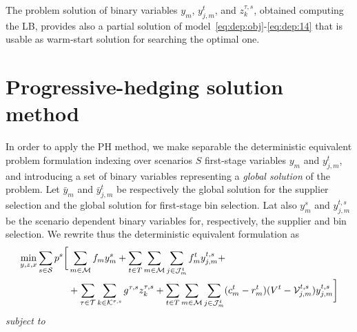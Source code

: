 \documentclass[a4paper,11pt]{article}
\begin{document}
	The problem solution of binary variables $ y_m$, $ y_{j,m}^t$, and $ z_k^{\tau,s}$, obtained computing the LB, provides also a partial solution of model~\eqref{eq:dep:obj}-\eqref{eq:dep:14} that is usable as warm-start solution for searching the optimal one.
	
	\section{Progressive-hedging solution method}\label{s:phm}
	In order to apply the PH method, we make separable the deterministic equivalent problem formulation indexing over scenarios $ S$ first-stage variables $ y_m$ and $ y^t_{j,m}$, and introducing a set of binary variables representing a \textit{global solution} of the problem.
	Let $ \bar{y}_m$ and $ \bar{y}^t_{j,m}$ be respectively the global solution for the supplier selection and the global solution for first-stage bin selection.
	Lat also $ y^s_m$ and $y^{t,s}_{j,m}$ be the scenario dependent binary variables for, respectively, the supplier and bin selection.
	We rewrite thus the deterministic equivalent formulation as
	\begin{equation}
	\begin{split}
		\min_{y,z,x} \sum_{s \in \cal S} p^{s} \biggl[ & \sum_{m \in \cal M} {f_{m}} y^s_{m} +  \sum_{t \in T} \sum_{m \in {{\cal M}}} \sum_{j \in {\cal J}_{m}^t} f_{m}^t y^{t,s}_{j,m} + \\
		& + \sum_{\tau \in \cal T} \sum_{k \in {\cal K}^{\tau,s}} g^{\tau,s} z_k^{\tau,s} + \sum_{t \in T} \sum_{m \in {\cal M}} \sum_{j \in {\cal J}^t_{m}} (c_{m}^t-r_{m}^t)(V^{t} - {\cal V}_{j,m}^{t,s}) y^{t,s}_{j,m} \biggr] \label{eq:depph:obj}
	\end{split}
	\end{equation}
	\textit{subject to}
\end{document}
